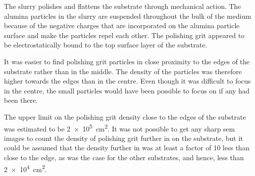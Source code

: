 The slurry polishes and flattens the substrate through mechanical action. The alumina particles in the slurry are suspended throughout the bulk of the medium because of the negative charges that are incorporated on the alumina particle surface and make the particles repel each other. The polishing grit appeared to be electrostatically bound to the top surface layer of the substrate.

It was easier to find polishing grit particles in close proximity to the edges of the substrate rather than in the middle. The density of the particles was therefore higher towards the edges than in the centre. Even though it was difficult to focus in the centre, the small particles would have been possible to focus on if any had been there.

The upper limit on the polishing grit density close to the edges of the substrate was estimated to be \SI{2e5}{\centi\metre^{2}}. It was not possible to get any sharp \ac{sem} images to count the density of polishing grit further in on the substrate, but it could be assumed that the density further in was at least a factor of 10 less than close to the edge, as was the case for the other substrates, and hence, less than \SI{2e4}{\centi\metre^{2}}.

\begin{comment}

    \begin{subfigure}[t]{\textwidth}
        \caption{}\label{fig:subAa_large-grit}
          \begin{minipage}[c]{0.43\linewidth}
            \centering
            \texttt{[image: substrateA\_a1\_m016.jpg]}
          \end{minipage}
          \hfill
          \begin{minipage}[c]{0.43\linewidth}
            \centering
            \texttt{[image: eds\_subA\_SiO2.jpg]}
          \end{minipage}
          \begin{minipage}[c]{0.11\linewidth}
            \centering
            \atomicTable[&][&][&]
          \end{minipage}
    \end{subfigure}
    \par\bigskip
\subsubsection{Silicon Carbide (\ce{SiC}) and Silica (SiO2)}
A particle with a diameter of \SI{200}{\nano\metre} is shown in Fig.~\ref{fig:subAa_large-grit} with the corresponding \ac{eds} spectrum. This particle was considerably larger and had a rougher surface than the more frequently observed \SI{50}{\nano\metre} particles that were found to be residual polishing grit. The \ac{eds} spectrum of the particle revealed that the particle consisted of \ce{Si}, \ce{C}, and \ce{O}, which indicated that this particle could be residual \ce{SIO2} polishing grit, \ce{SiC} polishing grit, or an agglomeration of both.
\end{comment}

